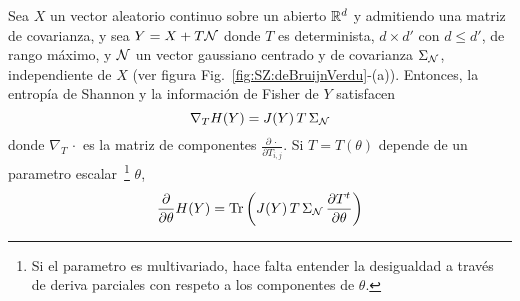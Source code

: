 \begin{teorema}
  Sea $X$ un  vector aleatorio continuo sobre un  abierto $\mathbb{R}^d$ y admitiendo
  una matriz de covarianza, y sea $Y  = X + T \mathcal{N}$ donde $T$ es determinista,
  $d  \times d'$  con $  d \le  d'$,  de rango  m\'aximo, y  $\mathcal{N}$ un  vector
  gaussiano centrado y de  covarianza $\Sigma_{\mathcal{N}}$, independiente de $X$ (ver
  figura  Fig.~\ref{fig:SZ:deBruijnVerdu}-(a)).    Entonces,  la  entrop\'ia  de
  Shannon y la informaci\'on de Fisher de $Y$ satisfacen
  \[
  \nabla_T H(Y) = J(Y) \, T \, \Sigma_{\mathcal{N}}
  \]
  donde  $\nabla_T \,  \cdot$ es  la  matriz de  componentes $\frac{\partial  \,
    \cdot}{\partial  T_{i,j}}$.  Si  $T  = T(\theta)$  depende  de un  parametro
  escalar~\footnote{Si  el parametro  es  multivariado, hace  falta entender  la
    desigualdad a trav\'es de deriva  parciales con respeto a los componentes de
    $\theta$.}   $\theta$,
  \[
  \frac{\partial}{\partial \theta}  H(Y) = \operatorname{Tr}\left( J(Y) \,  T \, \Sigma_{\mathcal{N}}
    \, \frac{\partial T^t}{\partial \theta} \right)
  \]
\end{teorema}
%
